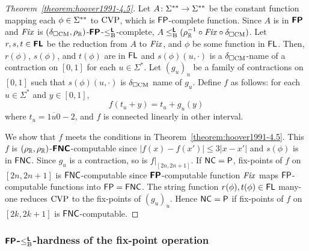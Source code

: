 \documentclass[envcountsame,orivec,oribibl]{llncs}
\begin{document}
\begin{proof}
[Theorem~\ref{theorem:hoover1991-4.5}]
 Let $A \colon \Sigma ^{**} \to \Sigma ^{**}$ be the constant function mapping each $\phi \in \Sigma ^{**}$ to $\mathrm{CVP}$, which is $\mathsf{FP}$-complete function.
 Since  $A$ is in $\text{\bfseries \sffamily \upshape FP}$ and $\mathit{Fix}$ is $(\delta _{\square \mathrm{CM}}, \rho _\mathbb R)$-$\text{\bfseries \sffamily \upshape FP}$-$\leq _{\mathrm B} ^{\text{\bfseries \sffamily \upshape L}}$-complete, $A \leq _{\mathrm B} ^{\text{\bfseries \sffamily \upshape L}} (\rho _\mathbb R^{-1} \circ \mathit{Fix} \circ \delta _{\square \mathrm{CM}})$.
 Let $r,s,t \in \text{\bfseries \sffamily \upshape FL}$ be the reduction from $A$ to $\mathit{Fix}$,
 and $\phi$ be some function in $\mathsf{FL}$.
 Then, $r(\phi)$, $s(\phi)$, and $t(\phi)$ are in $\mathsf{FL}$ and
 $s(\phi)(u, \cdot)$ is a $\delta _{\square \mathrm{CM}}$-name of a contraction on $[0,1]$ 
 for each $u \in \Sigma^*$.
 Let $(g_u)_u$ be a family of contractions on $[0,1]$
 such that $s(\phi)(u, \cdot)$ is $\delta _{\square \mathrm{CM}}$ name of $g_u$.
 Define $f$ as follows: for each $u \in \Sigma^*$ and $y \in [0, 1]$,
 \begin{equation}
  \label{eq:def-f}
 f(t_u + y) = t_u + g_u(y)
 \end{equation}
 where $t_u = \overline{1u0}-2$, 
 and $f$ is connected linearly in other interval.

 We show that $f$ meets the conditions in Theorem~\ref{theorem:hoover1991-4.5}.
 This $f$ is $(\rho _\mathbb R, \rho _\mathbb R)$-$\text{\bfseries \sffamily \upshape FNC}$-computable since 
 $|f(x) - f(x')| \le 3|x-x'|$ and $s(\phi)$ is in $\mathsf{FNC}$.
 Since $g_u$ is a contraction, so is $f|_{[2n, 2n+1]}$.
 If $\mathsf{NC} = \mathsf{P}$,
 fix-points of $f$ on $[2n, 2n+1]$ 
 is $\mathsf{FNC}$-computable since $\text{\bfseries \sffamily \upshape FP}$-computable function 
 $\mathit{Fix}$ maps $\mathsf{FP}$-computable functions into $\mathsf{FP} = \mathsf{FNC}$.
 The string function $r(\phi), t(\phi) \in \mathsf{FL}$ many-one reduces
 $\mathrm{CVP}$ to the fix-points of $(g_u)_u$.
 Hence $\mathsf{NC} = \mathsf{P}$ if fix-points of $f$ on $[2k, 2k+1]$ is $\mathsf{FNC}$-computable.
\end{proof}

\subsubsection{$\text{\bfseries \sffamily \upshape FP}$-$\leq _{\mathrm B} ^{\text{\bfseries \sffamily \upshape L}}$-hardness of the fix-point operation}
\end{document}
